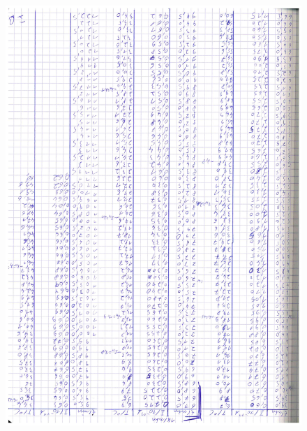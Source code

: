 \begin{figure}[htb]
  \centering
  \includegraphics[height=\textheight, angle=180]{data/Messdaten2.pdf}
\end{figure}
